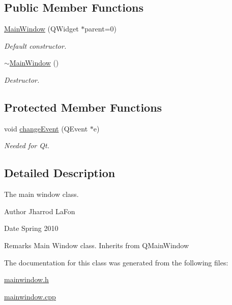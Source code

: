 \subsection*{Public Member Functions}
\begin{DoxyCompactItemize}
\item 
\hypertarget{classMainWindow_a8b244be8b7b7db1b08de2a2acb9409db}{
\hyperlink{classMainWindow_a8b244be8b7b7db1b08de2a2acb9409db}{MainWindow} (QWidget $\ast$parent=0)}
\label{classMainWindow_a8b244be8b7b7db1b08de2a2acb9409db}

\begin{DoxyCompactList}\small\item\em Default constructor. \item\end{DoxyCompactList}\item 
\hypertarget{classMainWindow_ae98d00a93bc118200eeef9f9bba1dba7}{
\hyperlink{classMainWindow_ae98d00a93bc118200eeef9f9bba1dba7}{$\sim$MainWindow} ()}
\label{classMainWindow_ae98d00a93bc118200eeef9f9bba1dba7}

\begin{DoxyCompactList}\small\item\em Destructor. \item\end{DoxyCompactList}\end{DoxyCompactItemize}
\subsection*{Protected Member Functions}
\begin{DoxyCompactItemize}
\item 
\hypertarget{classMainWindow_af4ca5d0d3d18ddcb7d54b6596bbf4797}{
void \hyperlink{classMainWindow_af4ca5d0d3d18ddcb7d54b6596bbf4797}{changeEvent} (QEvent $\ast$e)}
\label{classMainWindow_af4ca5d0d3d18ddcb7d54b6596bbf4797}

\begin{DoxyCompactList}\small\item\em Needed for Qt. \item\end{DoxyCompactList}\end{DoxyCompactItemize}


\subsection{Detailed Description}
The main window class. \begin{DoxyAuthor}{Author}
Jharrod LaFon 
\end{DoxyAuthor}
\begin{DoxyDate}{Date}
Spring 2010 
\end{DoxyDate}
\begin{DoxyRemark}{Remarks}
Main Window class. Inherits from QMainWindow 
\end{DoxyRemark}


The documentation for this class was generated from the following files:\begin{DoxyCompactItemize}
\item 
\hyperlink{mainwindow_8h}{mainwindow.h}\item 
\hyperlink{mainwindow_8cpp}{mainwindow.cpp}\end{DoxyCompactItemize}
